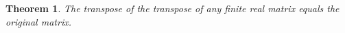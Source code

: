 \documentclass{article}
\newtheorem{theorem}{Theorem}
\begin{document}
\begin{theorem}\label{thm:R06}
The transpose of the transpose of any finite real matrix equals the original matrix.
\end{theorem}
\end{document}
